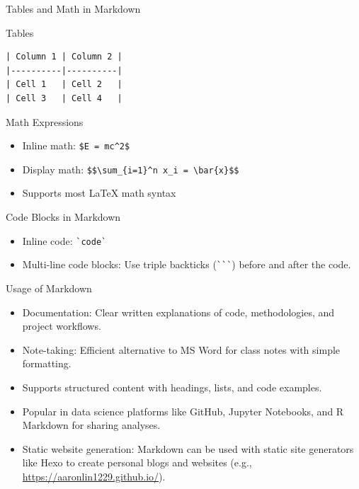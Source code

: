 \documentclass[10pt]{beamer}
\begin{document}
\begin{frame}[fragile]{Tables and Math in Markdown}
  \begin{block}{Tables}
    \begin{verbatim}
| Column 1 | Column 2 |
|----------|----------|
| Cell 1   | Cell 2   |
| Cell 3   | Cell 4   |
    \end{verbatim}
  \end{block}
  
  \begin{block}{Math Expressions}
    \begin{itemize}
      \item Inline math: \verb|$E = mc^2$|
      \item Display math: \verb|$$\sum_{i=1}^n x_i = \bar{x}$$|
      \item Supports most LaTeX math syntax
    \end{itemize}
  \end{block}
\end{frame}


\begin{frame}[fragile]{Code Blocks in Markdown}
  \begin{itemize}
    \item Inline code: \verb|`code`|
    \item Multi-line code blocks: Use triple backticks (\verb|```|) before and after the code.
  \end{itemize}
\end{frame}

\begin{frame}[fragile]{Usage of Markdown}
  \begin{itemize}
    \item Documentation: Clear written explanations of code, methodologies, and project workflows.
    \item Note-taking: Efficient alternative to MS Word for class notes with simple formatting.
    \item Supports structured content with headings, lists, and code examples.
    \item Popular in data science platforms like GitHub, Jupyter Notebooks, and R Markdown for sharing analyses.
    \item Static website generation: Markdown can be used with static site generators like Hexo to create personal blogs and websites (e.g., \url{https://aaronlin1229.github.io/}).
  \end{itemize}
\end{frame}
\end{document}
